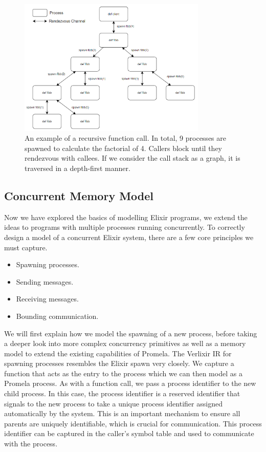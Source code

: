 \begin{figure}[h]
    \centering
    \includegraphics[width=0.8\textwidth]{images/function_call.png}
    \caption{An example of a recursive function call. In total, 9 processes are spawned to calculate the factorial of 4. Callers block until they rendezvous with callees. If we consider the call stack as a graph, it is traversed in a depth-first manner.}
    \label{fig:function_call}
\end{figure}
\subsection{Concurrent Memory Model} \label{sec:memory_model}
Now we have explored the basics of modelling Elixir programs, we extend the ideas to programs with multiple processes running concurrently. To correctly design a model of a concurrent Elixir system, there are a few core principles we must capture.
\begin{itemize}
    \item Spawning processes.
    \item Sending messages.
    \item Receiving messages.
    \item Bounding communication.
\end{itemize}
We will first explain how we model the spawning of a new process, before taking a deeper look into more complex concurrency primitives as well as a memory model to extend the existing capabilities of Promela. The Verlixir IR for spawning processes resembles the Elixir spawn very closely. We capture a function that acts as the entry to the process which we can then model as a Promela process. As with a function call, we pass a process identifier to the new child process. In this case, the process identifier is a reserved identifier that signals to the new process to take a unique process identifier assigned automatically by the system. This is an important mechanism to ensure all parents are uniquely identifiable, which is crucial for communication. This process identifier can be captured in the caller's symbol table and used to communicate with the process.
\\ \\

